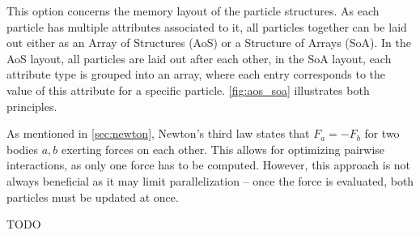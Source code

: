\begin{description}[leftmargin=!,labelwidth=\widthof{\textbf{Cell size factor }}]
	\item[\textbf{Data Layout}] This option concerns the memory layout of the particle structures. As each particle has multiple attributes associated to it, all particles together can be laid out either as an Array of Structures (AoS) or a Structure of Arrays (SoA). In the AoS layout, all particles are laid out after each other, in the SoA layout, each attribute type is grouped into an array, where each entry corresponds to the value of this attribute for a specific particle. \autoref{fig:aos_soa} illustrates both principles.
	\item[\textbf{Newton3}] As mentioned in \autoref{sec:newton}, Newton's third law states that $F_a = -F_b$ for two bodies $a, b$ exerting forces on each other. This allows for optimizing pairwise interactions, as only one force has to be computed. However, this approach is not always beneficial as it may limit parallelization -- once the force is evaluated, both particles must be updated at once.
	\item[\textbf{Cell Size Factor}] TODO %
\end{description}

